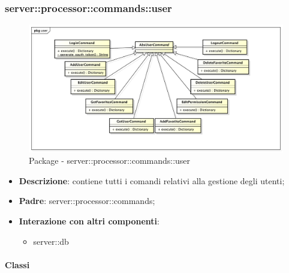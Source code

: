       \subsubsection{server::processor::commands::user} %
      \label{ssub:bdsm_app_server_processor_commands_user}
      \begin{figure}[!htbp]
        \centering
        \centerline{\includegraphics[scale=0.5]{./images/server/user.pdf}}
        \caption{Package - server::processor::commands::user}
      \end{figure}

      \begin{itemize}
        \item \textbf{Descrizione}: contiene tutti i comandi relativi alla gestione degli utenti;
        \item \textbf{Padre}: server::processor::commands;
        \item \textbf{Interazione con altri componenti}:
          \begin{itemize}
            \item server::db
          \end{itemize}
      \end{itemize}

        \paragraph{Classi} %

